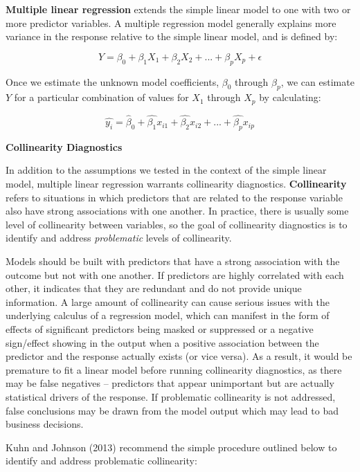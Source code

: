\documentclass[
]{book}
\begin{document}
\textbf{Multiple linear regression} extends the simple linear model to one with two or more predictor variables. A multiple regression model generally explains more variance in the response relative to the simple linear model, and is defined by:

\[ Y = \beta_0 + \beta_1 X_1 + \beta_2 X_2 + {...} + \beta_p X_p + \epsilon \]

Once we estimate the unknown model coefficients, \(\beta_0\) through \(\beta_p\), we can estimate \(Y\) for a particular combination of values for \(X_1\) through \(X_p\) by calculating:

\[ \hat{y_i} = \hat{\beta}_0 + \hat{\beta_1}x_{i1} + \hat{\beta_2}x_{i2} + {...} + \hat{\beta_p} x_{ip} \]

\textbf{Collinearity Diagnostics}

In addition to the assumptions we tested in the context of the simple linear model, multiple linear regression warrants collinearity diagnostics. \textbf{Collinearity} refers to situations in which predictors that are related to the response variable also have strong associations with one another. In practice, there is usually some level of collinearity between variables, so the goal of collinearity diagnostics is to identify and address \emph{problematic} levels of collinearity.

Models should be built with predictors that have a strong association with the outcome but not with one another. If predictors are highly correlated with each other, it indicates that they are redundant and do not provide unique information. A large amount of collinearity can cause serious issues with the underlying calculus of a regression model, which can manifest in the form of effects of significant predictors being masked or suppressed or a negative sign/effect showing in the output when a positive association between the predictor and the response actually exists (or vice versa). As a result, it would be premature to fit a linear model before running collinearity diagnostics, as there may be false negatives -- predictors that appear unimportant but are actually statistical drivers of the response. If problematic collinearity is not addressed, false conclusions may be drawn from the model output which may lead to bad business decisions.

Kuhn and Johnson (2013) recommend the simple procedure outlined below to identify and address problematic collinearity:
\end{document}
